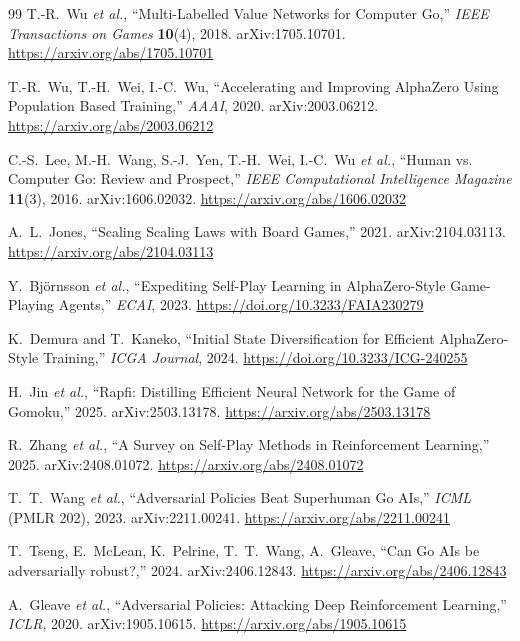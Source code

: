 \documentclass[11pt]{article}
\begin{document}
\begin{thebibliography}{99}
 T.-R.~Wu \emph{et al.},
  ``Multi-Labelled Value Networks for Computer Go,''
  \emph{IEEE Transactions on Games} \textbf{10}(4), 2018. arXiv:1705.10701.
  \url{https://arxiv.org/abs/1705.10701}

 T.-R.~Wu, T.-H.~Wei, I.-C.~Wu,
  ``Accelerating and Improving AlphaZero Using Population Based Training,''
  \emph{AAAI}, 2020. arXiv:2003.06212. \url{https://arxiv.org/abs/2003.06212}

 C.-S.~Lee, M.-H.~Wang, S.-J.~Yen, T.-H.~Wei, I.-C.~Wu \emph{et al.},
  ``Human vs. Computer Go: Review and Prospect,''
  \emph{IEEE Computational Intelligence Magazine} \textbf{11}(3), 2016. arXiv:1606.02032.
  \url{https://arxiv.org/abs/1606.02032}

 A.~L.~Jones,
  ``Scaling Scaling Laws with Board Games,'' 2021. arXiv:2104.03113.
  \url{https://arxiv.org/abs/2104.03113}

 Y.~Bj\"ornsson \emph{et al.},
  ``Expediting Self-Play Learning in AlphaZero-Style Game-Playing Agents,''
  \emph{ECAI}, 2023. \url{https://doi.org/10.3233/FAIA230279}

 K.~Demura and T.~Kaneko,
  ``Initial State Diversification for Efficient AlphaZero-Style Training,''
  \emph{ICGA Journal}, 2024. \url{https://doi.org/10.3233/ICG-240255}

 H.~Jin \emph{et al.},
  ``Rapfi: Distilling Efficient Neural Network for the Game of Gomoku,'' 2025.
  arXiv:2503.13178. \url{https://arxiv.org/abs/2503.13178}

 R.~Zhang \emph{et al.},
  ``A Survey on Self-Play Methods in Reinforcement Learning,'' 2025. arXiv:2408.01072.
  \url{https://arxiv.org/abs/2408.01072}

 T.~T.~Wang \emph{et al.},
  ``Adversarial Policies Beat Superhuman Go AIs,'' \emph{ICML} (PMLR 202), 2023.
  arXiv:2211.00241. \url{https://arxiv.org/abs/2211.00241}

 T.~Tseng, E.~McLean, K.~Pelrine, T.~T.~Wang, A.~Gleave,
  ``Can Go AIs be adversarially robust?,'' 2024. arXiv:2406.12843.
  \url{https://arxiv.org/abs/2406.12843}

 A.~Gleave \emph{et al.},
  ``Adversarial Policies: Attacking Deep Reinforcement Learning,'' \emph{ICLR}, 2020.
  arXiv:1905.10615. \url{https://arxiv.org/abs/1905.10615}


\end{thebibliography}
\end{document}
